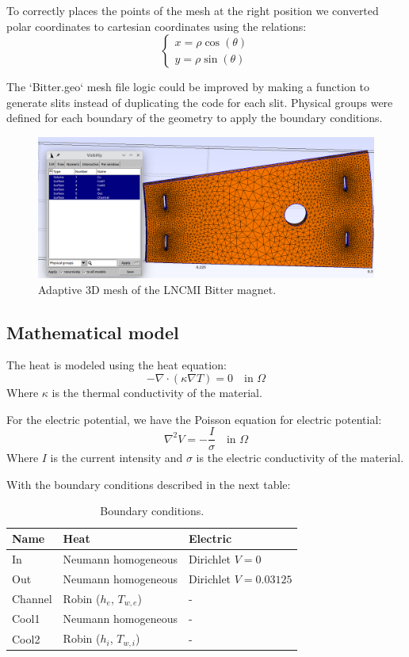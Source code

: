 \documentclass[12pt]{article}
\begin{document}
To correctly places the points of the mesh at the right position we converted polar
coordinates to cartesian coordinates using the relations:
$$
\begin{cases}
	x = \rho \cos(\theta) \\
	y = \rho \sin(\theta)
\end{cases}
$$

The `Bitter.geo` mesh file logic could be improved by making a function to generate slits 
instead of duplicating the code for each slit. 
Physical groups were defined for each boundary of the geometry to apply the boundary conditions.



\begin{figure}[H]
	\centering
	\includegraphics[width=\textwidth]{images/bitter_mesh.png}
	\caption{Adaptive 3D mesh of the LNCMI Bitter magnet.}
\end{figure}

\subsection{Mathematical model}
The heat is modeled using the heat equation:
$$
	-\nabla \cdot (\kappa \nabla T) = 0 \quad \text{in } \Omega 
$$
Where $\kappa$ is the thermal conductivity of the material.

For the electric potential, we have the Poisson equation for electric potential:
$$
	\nabla^2 V = -\frac{I}{\sigma} \quad \text{in } \Omega
$$
Where $I$ is the current intensity and $\sigma$ is the electric conductivity of the material.  

With the boundary conditions described in the next table: 

\begin{table}[H]
	\centering
	\begin{tabular}{|l|l|l|}
	\hline
	\textbf{Name} & \textbf{Heat} & \textbf{Electric} \\ \hline
	In & Neumann homogeneous & Dirichlet $V = 0$ \\ \hline
	Out & Neumann homogeneous & Dirichlet $V = 0.03125$ \\ \hline
	Channel & Robin ($h_e$, $T_{w,e}$) & - \\ \hline
	Cool1 & Neumann homogeneous & - \\ \hline
	Cool2 & Robin ($h_i$, $T_{w,i}$) & - \\ \hline
	\end{tabular}
	\caption{Boundary conditions.}
	\label{tab:boundary_conditions}
\end{table}
\end{document}
